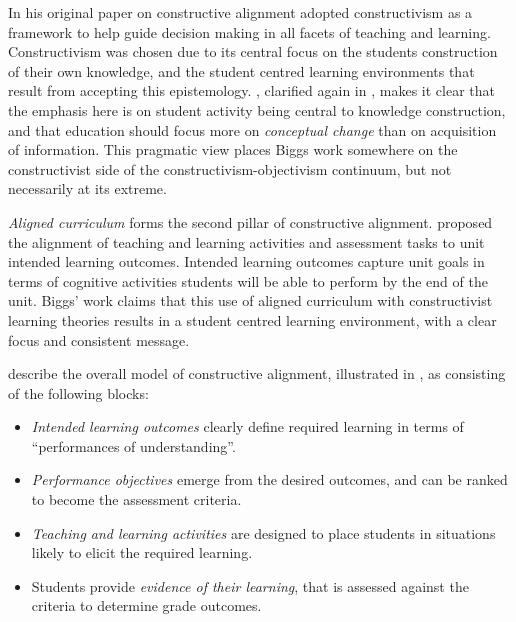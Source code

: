 In his original paper on constructive alignment \citet{Biggs:1996c} adopted constructivism as a framework to help guide decision making in all facets of teaching and learning. Constructivism was chosen due to its central focus on the students construction of their own knowledge, and the student centred learning environments that result from accepting this epistemology. \citet{Biggs:1996c}, clarified again in \citet{Biggs:2007}, makes it clear that the emphasis here is on student activity being central to knowledge construction, and that education should focus more on \emph{conceptual change} than on acquisition of information. This pragmatic view places Biggs work somewhere on the constructivist side of the constructivism-objectivism continuum, but not necessarily at its extreme. 

\emph{Aligned curriculum} forms the second pillar of constructive alignment. \citet{Biggs:1996c} proposed the alignment of teaching and learning activities and assessment tasks to unit intended learning outcomes. Intended learning outcomes capture unit goals in terms of cognitive activities students will be able to perform by the end of the unit. Biggs' work claims that this use of aligned curriculum with constructivist learning theories results in a student centred learning environment, with a clear focus and consistent message.

\citet{Houghton:2004} describe the overall model of constructive alignment, illustrated in , as consisting of the following blocks:
\begin{itemize}[noitemsep,nolistsep]
	\item \emph{Intended learning outcomes} clearly define required learning in terms of ``performances of understanding''.
	\item \emph{Performance objectives} emerge from the desired outcomes, and can be ranked to become the assessment criteria.
	\item \emph{Teaching and learning activities} are designed to place students in situations likely to elicit the required learning.
	\item Students provide \emph{evidence of their learning}, that is assessed against the criteria to determine grade outcomes.
\end{itemize}

